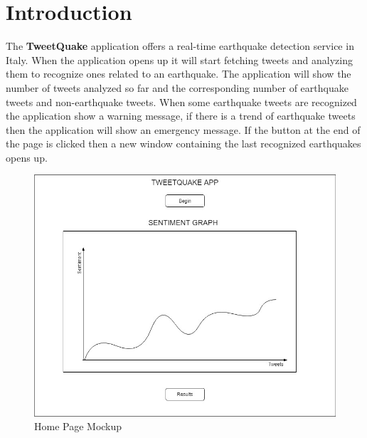 \documentclass[a4paper, oneside]{article}
\begin{document}
\baselineskip 13pt

\begin{frontespizio} 
\Preambolo{\renewcommand{\frontpretitlefont}{\fontsize{15}{12}\scshape}}
\Rientro {1cm}
 \Punteggiatura {}
\end{frontespizio}

\clearpage

	\tableofcontents\thispagestyle{empty}
	\clearpage


\section{Introduction}
The \textbf{TweetQuake} application offers a real-time earthquake detection service in Italy. When the application opens up it will start fetching tweets and analyzing them to recognize ones related to an earthquake.
The application will show the number of tweets analyzed so far and the corresponding number of earthquake tweets and non-earthquake tweets. When some earthquake tweets are recognized the application show a warning message, if there is a trend of earthquake tweets then the application will show an emergency message. If the button at the end of the page is clicked then a new window containing the last recognized earthquakes opens up.
\vspace{5mm}
\begin{figure}[h]
\centering
\includegraphics[width=\textwidth]{./images/diagrams/HomeMockup} 
\caption{Home Page Mockup}
\label{fig:mockup}
\end{figure}
\end{document}
